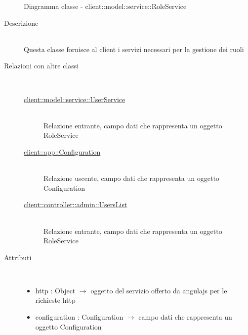 \vspace{0.5cm}
\hypertarget{client::model::service::RoleService}{}
\begin{figure}[H]
	\centering
	\caption{Diagramma classe - client::model::service::RoleService}
\end{figure}\begin{description}
\item[Descrizione] \hfill \\
Questa classe fornisce al client i servizi necessari per la gestione dei ruoli
\item[Relazioni con altre classi] \hfill \\
\vspace{-7mm}
\begin{description}
	\item[\hyperlink{client::model::service::UserService}{client::model::service::UserService}] \hfill \\
	Relazione entrante, campo dati che rappresenta un oggetto RoleService
	\item[\hyperlink{client::app::Configuration}{client::app::Configuration}] \hfill \\
	Relazione uscente, campo dati che rappresenta un oggetto Configuration
	\item[\hyperlink{client::controller::admin::UsersList}{client::controller::admin::UsersList}] \hfill \\
	Relazione entrante, campo dati che rappresenta un oggetto RoleService
\end{description}

\item[Attributi] \hfill \\
\vspace{-7mm}
\begin{itemize}
	\item http : Object $\rightarrow$ oggetto del servizio offerto da angulajs per le richieste http
	\item configuration : Configuration $\rightarrow$ campo dati che rappresenta un oggetto Configuration
\end{itemize}


\end{description}
